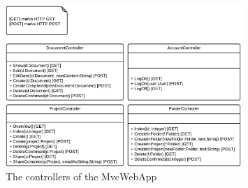 \begin{figure}[hbt]
    \centering
    \includegraphics[width=0.8\textwidth]{Software_design/graphics/MvcWebApp.png}
    \caption{The controllers of the MvcWebApp}
    \label{fig:mvcwebapp-diagram}
\end{figure}

